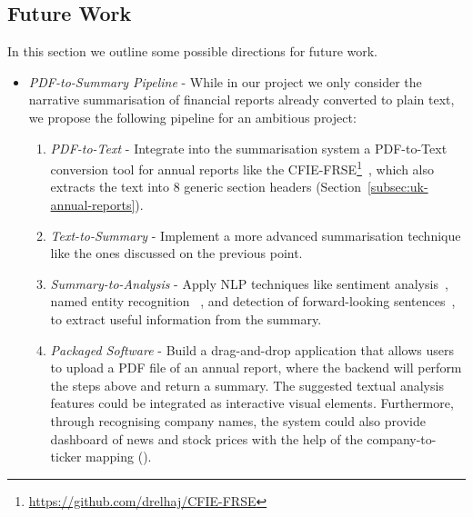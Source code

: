 \subsection{Future Work}\label{subsec:future-work}
In this section we outline some possible directions for future work.
\begin{itemize}
    \item \emph{PDF-to-Summary Pipeline} - While in our project we only consider the narrative summarisation of
    financial reports already converted to plain text, we propose the following pipeline for an ambitious project:
    \begin{enumerate}
        \item \emph{PDF-to-Text} - Integrate into the summarisation system a PDF-to-Text conversion tool for annual
        reports like the CFIE-FRSE\footnote{\url{https://github.com/drelhaj/CFIE-FRSE}}~\cite{elhaj2019multilingual}, which
        also extracts the text into 8 generic section headers (Section~\ref{subsec:uk-annual-reports}).
        \item \emph{Text-to-Summary} - Implement a more advanced summarisation technique like the ones discussed on the previous point.
        \item \emph{Summary-to-Analysis} - Apply NLP techniques like sentiment analysis~\cite{araci2019finbert}, named entity recognition
       ~\cite{zhang2022finbertmrc}, and detection of forward-looking sentences~\cite{stihec-etal-2021-preliminary},
        to extract useful information from the summary.
        \item \emph{Packaged Software} - Build a drag-and-drop application that allows users to upload a PDF file of an
        annual report, where the backend will perform the steps above and return a summary.
        The suggested textual analysis features could be integrated as interactive visual elements.
        Furthermore, through recognising company names, the system could also provide dashboard of news and stock prices
        with the help of the company-to-ticker mapping (\cite{}).
    \end{enumerate}
\end{itemize}